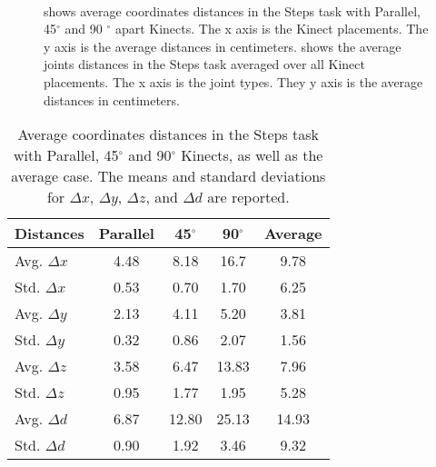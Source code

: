 % 
% 
\begin{figure}[!htb]
  \centering

  \subfloat[]{
    
    \label{fig:steps_coordinates}
  } \\
  \subfloat[]{
    
    \label{fig:steps_joints}
  }

  \caption{\protect{} shows average coordinates distances in the Steps task with Parallel, 45$^{\circ}$ and 90 $^{\circ}$ apart Kinects. The x axis is the Kinect placements. The y axis is the average distances in centimeters. \protect{} shows the average joints distances in the Steps task averaged over all Kinect placements. The x axis is the joint types. They y axis is the average distances in centimeters.}

  \label{fig:steps_coordinates_joints}
\end{figure}

% 
% 
\begin{table}[!htb]
\centering
  
  \begin{tabularx}{1.0\columnwidth}{||X c c c c||} 
   \hline
   \textbf{Distances} & \textbf{Parallel} & \textbf{45$^{\circ}$} & \textbf{90$^{\circ}$} & \textbf{Average} \\ [0.5ex] 
   \hline\hline
   Avg. $\Delta x$ & 4.48 & 8.18 & 16.7 & 9.78 \\
   \hline
   Std. $\Delta x$ & 0.53 & 0.70 & 1.70 & 6.25 \\
   \hline
   Avg. $\Delta y$ & 2.13 & 4.11 & 5.20 & 3.81 \\
   \hline
   Std. $\Delta y$ & 0.32 & 0.86 & 2.07 & 1.56 \\
   \hline
   Avg. $\Delta z$ & 3.58 & 6.47 & 13.83 & 7.96 \\
   \hline
   Std. $\Delta z$ & 0.95 & 1.77 & 1.95 & 5.28 \\
   \hline
   Avg. $\Delta d$ & 6.87 & 12.80 & 25.13 & 14.93 \\
   \hline
   Std. $\Delta d$ & 0.90 & 1.92 & 3.46 & 9.32 \\
   \hline
  \end{tabularx}

  \caption{Average coordinates distances in the Steps task with Parallel, 45$^{\circ}$ and 90$^{\circ}$ Kinects, as well as the average case. The means and standard deviations for $\Delta x$, $\Delta y$, $\Delta z$, and $\Delta d$ are reported.}
  
  \label{table:steps_coordinates_values}
\end{table}

